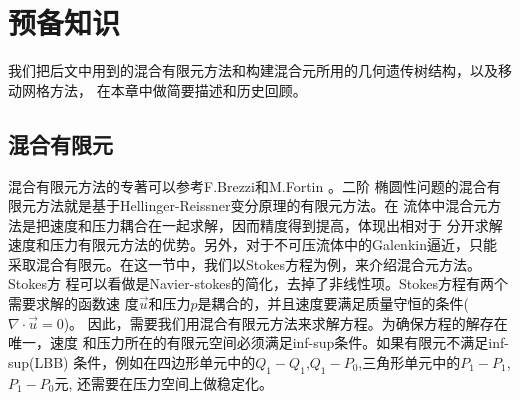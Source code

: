 ﻿%


\chapter{预备知识}
\label{chapter:mixed-element}


我们把后文中用到的混合有限元方法和构建混合元所用的几何遗传树结构，以及移动网格方法，
在本章中做简要描述和历史回顾。
\section{混合有限元}
    混合有限元方法的专著可以参考F.Brezzi和M.Fortin \cite{brezzi2012mixed}。二阶
    椭圆性问题的混合有限元方法就是基于Hellinger-Reissner变分原理的有限元方法。在
    流体中混合元方法是把速度和压力耦合在一起求解，因而精度得到提高，体现出相对于
    分开求解速度和压力有限元方法的优势。另外，对于不可压流体中的Galenkin逼近，只能
    采取混合有限元。在这一节中，我们以Stokes方程为例，来介绍混合元方法。Stokes方
    程可以看做是Navier-stokes的简化，去掉了非线性项。Stokes方程有两个需要求解的函数速
    度$\vec{u}$和压力$p$是耦合的，并且速度要满足质量守恒的条件($\nabla \cdot \vec{u} = 0$)。
    因此，需要我们用混合有限元方法来求解方程。为确保方程的解存在唯一，速度
    和压力所在的有限元空间必须满足inf-sup条件。如果有限元不满足inf-sup(LBB)
    条件，例如在四边形单元中的$Q_1-Q_1$,$Q_1-P_0$,三角形单元中的$P_1-P_1$,$P_1-P_0$元,
    还需要在压力空间上做稳定化。

